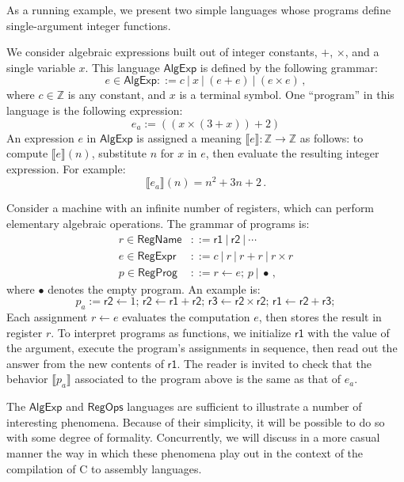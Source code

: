 \documentclass[acmsmall,10pt,review,anonymous]{acmart}
\newcommand{\kw}[1]{\ensuremath{ \textsf{#1} }}
\begin{document}
{\color{gray} %

As a running example,
we present two simple languages
whose programs define single-argument integer functions.

\begin{example}[$\kw{AlgExp}$] %
We consider algebraic expressions
built out of integer constants, $+$, $\times$,
and a single variable $x$.
This language $\kw{AlgExp}$ is defined by the following grammar:
\[
  e \in \kw{AlgExp} ::= c \:|\: x \:|\: (e + e) \:|\: (e \times e) \,,
\]
where $c \in \mathbb{Z}$ is any constant,
and $x$ is a terminal symbol.
One ``program'' in this language is the following expression:
\[
  e_a := ((x \times (3 + x)) + 2)
\]
An expression $e$ in \kw{AlgExp} is assigned a meaning
$\llbracket e \rrbracket : \mathbb{Z} \rightarrow \mathbb{Z}$
as follows:
to compute $\llbracket e \rrbracket(n)$,
substitute $n$ for $x$ in $e$,
then evaluate the resulting integer expression.
For example:
\[
  \llbracket e_a \rrbracket (n) = n^2 + 3n + 2 \,.
\]
\end{example}

\begin{example}[$\kw{RegProg}$] %
Consider a machine with an infinite number of registers,
which can perform elementary algebraic operations.
The grammar of programs is:
\begin{align*}
  r \in \kw{RegName} &::= \kw{r1} \:|\: \kw{r2} \:|\: \cdots \\
  e \in \kw{RegExpr} &::= c \:|\: r \:|\: r + r \:|\: r \times r \\
  p \in \kw{RegProg} &::= r \leftarrow e; \, p \:|\: \bullet \,,
\end{align*}
where $\bullet$ denotes the empty program.
An example is:
\[
  p_a :=
  \kw{r2} \leftarrow 1; \,
  \kw{r2} \leftarrow \kw{r1} + \kw{r2}; \,
  \kw{r3} \leftarrow \kw{r2} \times \kw{r2}; \,
  \kw{r1} \leftarrow \kw{r2} + \kw{r3};
\]
Each assignment $r \leftarrow e$ evaluates the computation $e$,
then stores the result in register $r$.
To interpret programs as functions,
we initialize $\kw{r1}$ with the value of the argument,
execute the program's assignments in sequence,
then read out the answer from the new contents of $\kw{r1}$.
The reader is invited to check that
the behavior $\llbracket p_a \rrbracket$ associated to the program above
is the same as that of $e_a$.
\end{example}

The $\kw{AlgExp}$ and $\kw{RegOps}$ languages
are sufficient to illustrate a number of interesting phenomena.
Because of their simplicity,
it will be possible to do so with some degree of formality.
Concurrently,
we will discuss in a more casual manner
the way in which these phenomena play out
in the context of the compilation of C to assembly languages.

} %
\end{document}
